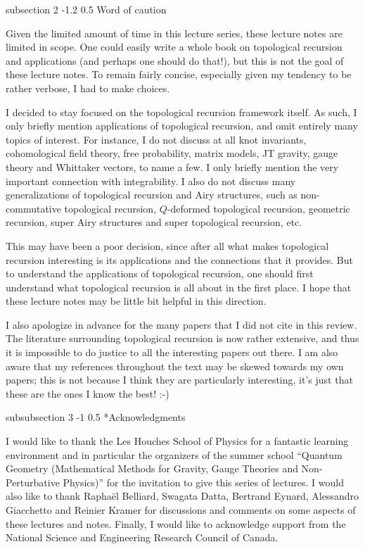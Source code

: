 \documentclass[reqno,oneside,11pt]{amsart}
\makeatletter
\theoremstyle{plain}
\theoremstyle{definition}
\theoremstyle{remark}
\numberwithin{equation}{section}
\renewcommand{\subsection}{\@startsection
{subsection}%
{2}%
{\z@}%
{-1.2\baselineskip}%
{0.5\baselineskip}%
{\normalfont \bf \normalsize}} %
\renewcommand{\subsubsection}{\@startsection
{subsubsection}%
{3}%
{\z@}%
{-1\baselineskip}%
{0.5\baselineskip}%
{\normalfont \it \normalsize}} %
\makeatother
\begin{document}
\subsection{Word of caution}

Given the limited amount of time in this lecture series, these lecture notes are limited in scope. One could easily write a whole book on topological recursion and applications (and perhaps one should do that!), but this is not the goal of these lecture notes. To remain fairly concise, especially given my tendency to be rather verbose, I had to make choices. 

I decided to stay focused on the topological recursion framework itself. As such, I only briefly mention applications of topological recursion, and omit entirely many topics of interest. For instance, I do not discuss at all knot invariants, cohomological field theory, free probability, matrix models, JT gravity, gauge theory and Whittaker vectors, to name a few. I only briefly mention the very important connection with integrability. I also do not discuss many generalizations of topological recursion and Airy structures, such as non-commutative topological recursion, $Q$-deformed topological recursion, geometric recursion, super Airy structures and super topological recursion, etc.

This may have been a poor decision, since after all what makes topological recursion interesting is its applications and the connections that it provides. But to understand the applications of topological recursion, one should first understand what topological recursion is all about in the first place. I hope that these lecture notes may be little bit helpful in this direction.

I also apologize in advance for the many papers that I did not cite in this review. The literature surrounding topological recursion is now rather extensive, and thus it is impossible to do justice to all the interesting papers out there. I am also aware that my references throughout the text may be skewed towards my own papers; this is not because I think they are particularly interesting, it's just that these are the ones  I know the best! :-)

\subsubsection*{Acknowledgments}

I would like to thank the Les Houches School of Physics for a fantastic learning environment and in particular the organizers of the summer school ``Quantum Geometry (Mathematical Methods for Gravity, Gauge  Theories and Non-Perturbative Physics)'' for the invitation to give this series of lectures. I would also like to thank Rapha\"el Belliard, Swagata Datta, Bertrand Eynard, Alessandro Giacchetto and Reinier Kramer for discussions and comments on some aspects of these lectures and notes. Finally, I would like to acknowledge support from the  National Science and Engineering Research Council of Canada.
\end{document}
